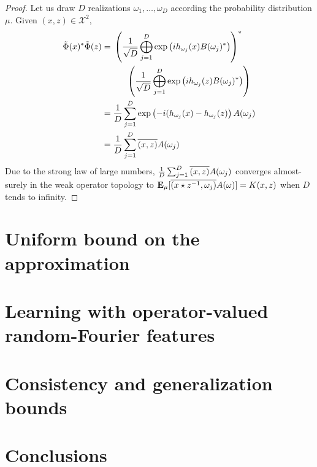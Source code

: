\begin{proof}
Let us draw $D$ realizations $\omega_1, \ldots, \omega_D$ according the probability distribution $\mu$. Given $(x,z) \in \mathcal{X}^2$, 
\begin{equation*}
\begin{aligned}
\tildePhi(x)^*\tildePhi(z)&= \begin{multlined}[t] \left(\frac{1}{\sqrt{D}}\Vect_{j=1}^D \exp\left(ih_{\omega_j}(x)B(\omega_j)^*\right)\right)^* \\ \left(\frac{1}{\sqrt{D}}\Vect_{j=1}^D \exp\left(ih_{\omega_j}(z)B(\omega_j)^*\right)\right) \end{multlined}\\
&= \frac{1}{D} \sum_{j=1}^D \exp\left(-i(h_{\omega_j}(x)-h_{\omega_j}(z)\right) A(\omega_j)\\
&= \frac{1}{D} \sum_{j=1}^D \conj{\pairing{x,z}}A(\omega_j)
\end{aligned}
\end{equation*}
Due to the strong law of large numbers, $ \frac{1}{D} \sum_{j=1}^D \overline{(x,z)}A(\omega_j)$ 
converges almost-surely in the weak operator topology to ${\text{\bf E}}_{\mu}[\overline{(x\star z^{-1},\omega_j)}A(\omega) ]=K(x,z)$ when $D$ tends to infinity.
\end{proof}

\section{Uniform bound on the approximation}
\label{sec:uniform_bound_on_the_approximation}

\section{Learning with operator-valued random-Fourier features}
\label{sec:learning_with_operator-valued_random-fourier_features}

\section{Consistency and generalization bounds}
\label{sec:consistency and generalization bounds}

\section{Conclusions}
\label{sec:conclusions}
